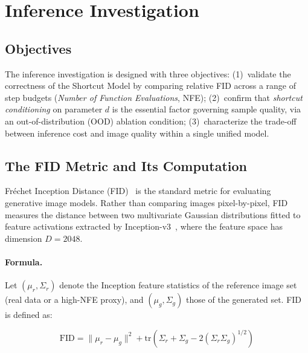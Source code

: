 
\section{Inference Investigation}
\label{sec:inference}

\subsection{Objectives}

The inference investigation is designed with three objectives:
(1)~validate the correctness of the Shortcut Model by comparing relative FID
across a range of step budgets (\textit{Number of Function Evaluations}, NFE);
(2)~confirm that \textit{shortcut conditioning} on parameter $d$ is the
essential factor governing sample quality, via an out-of-distribution (OOD)
ablation condition;
(3)~characterize the trade-off between inference cost and image quality within a
single unified model.

\subsection{The FID Metric and Its Computation}
\label{sec:fid}

Fréchet Inception Distance (FID)~\cite{heusel2017gans} is the standard metric
for evaluating generative image models.
Rather than comparing images pixel-by-pixel, FID measures the distance between
two multivariate Gaussian distributions fitted to feature activations extracted
by Inception-v3~\cite{szegedy2016rethinking}, where the feature space has
dimension $D = 2048$.

\paragraph{Formula.}
Let $(\mu_r, \Sigma_r)$ denote the Inception feature statistics of the
reference image set (real data or a high-NFE proxy), and $(\mu_g, \Sigma_g)$
those of the generated set. FID is defined as:

\begin{equation}
    \mathrm{FID} = \|\mu_r - \mu_g\|^2
    + \mathrm{tr}\!\left(\Sigma_r + \Sigma_g
      - 2\left(\Sigma_r \Sigma_g\right)^{1/2}\right)
    \label{eq:fid}
\end{equation}

